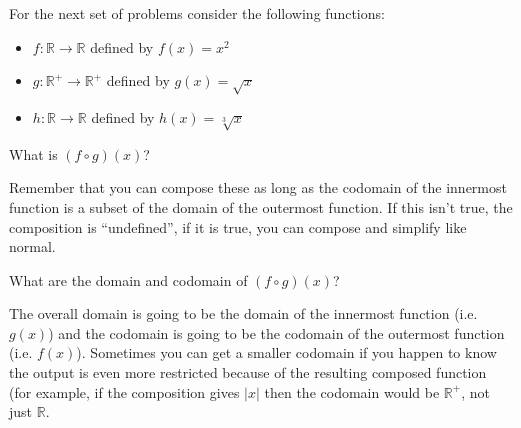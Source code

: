 \documentclass{ximera}
\begin{document}
For the next set of problems consider the following functions:
\begin{itemize}
    \item $f:\mathbb{R}\rightarrow\mathbb{R}$ defined by $f(x) = x^2$
    \item $g:\mathbb{R}^+\rightarrow\mathbb{R}^+$ defined by $g(x) = \sqrt{x}$
    \item $h:\mathbb{R}\rightarrow\mathbb{R}$ defined by $h(x) = \sqrt[3]{x}$
\end{itemize}

\begin{problem}
    What is $(f\circ g)(x)$? 
    \begin{multipleChoice}
    \end{multipleChoice}
    \begin{feedback}
        Remember that you can compose these as long as the codomain of the innermost function is a subset of the domain of the outermost function. If this isn't true, the composition is ``undefined'', if it is true, you can compose and simplify like normal.
    \end{feedback}
    
\end{problem}

\begin{problem}
    What are the domain and codomain of $(f\circ g)(x)$?
    \begin{multipleChoice}
    \end{multipleChoice}
    \begin{feedback}
        The overall domain is going to be the domain of the innermost function (i.e. $g(x)$) and the codomain is going to be the codomain of the outermost function (i.e. $f(x)$). Sometimes you can get a smaller codomain if you happen to know the output is even more restricted because of the resulting composed function (for example, if the composition gives $|x|$ then the codomain would be $\mathbb{R}^+$, not just $\mathbb{R}$.
    \end{feedback}
\end{problem}
\end{document}
